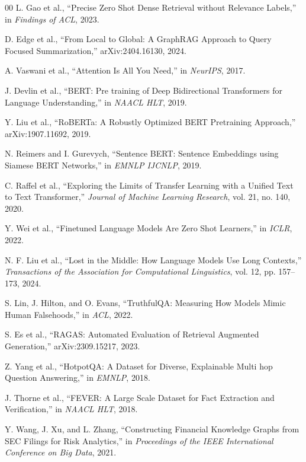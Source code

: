 \documentclass[conference]{IEEEtran}
\begin{document}
\begin{thebibliography}{00}
L. Gao et al., ``Precise Zero Shot Dense Retrieval without Relevance Labels,'' in \textit{Findings of ACL}, 2023.

D. Edge et al., ``From Local to Global: A GraphRAG Approach to Query Focused Summarization,'' arXiv:2404.16130, 2024.

A. Vaswani et al., ``Attention Is All You Need,'' in \textit{NeurIPS}, 2017.

J. Devlin et al., ``BERT: Pre training of Deep Bidirectional Transformers for Language Understanding,'' in \textit{NAACL HLT}, 2019.

Y. Liu et al., ``RoBERTa: A Robustly Optimized BERT Pretraining Approach,'' arXiv:1907.11692, 2019.

N. Reimers and I. Gurevych, ``Sentence BERT: Sentence Embeddings using Siamese BERT Networks,'' in \textit{EMNLP IJCNLP}, 2019.

C. Raffel et al., ``Exploring the Limits of Transfer Learning with a Unified Text to Text Transformer,'' \textit{Journal of Machine Learning Research}, vol. 21, no. 140, 2020.

Y. Wei et al., ``Finetuned Language Models Are Zero Shot Learners,'' in \textit{ICLR}, 2022.

N. F. Liu et al., ``Lost in the Middle: How Language Models Use Long Contexts,'' \textit{Transactions of the Association for Computational Linguistics}, vol. 12, pp. 157--173, 2024.

S. Lin, J. Hilton, and O. Evans, ``TruthfulQA: Measuring How Models Mimic Human Falsehoods,'' in \textit{ACL}, 2022.

S. Es et al., ``RAGAS: Automated Evaluation of Retrieval Augmented Generation,'' arXiv:2309.15217, 2023.

Z. Yang et al., ``HotpotQA: A Dataset for Diverse, Explainable Multi hop Question Answering,'' in \textit{EMNLP}, 2018.

J. Thorne et al., ``FEVER: A Large Scale Dataset for Fact Extraction and Verification,'' in \textit{NAACL HLT}, 2018.

Y. Wang, J. Xu, and L. Zhang, ``Constructing Financial Knowledge Graphs from SEC Filings for Risk Analytics,'' in \textit{Proceedings of the IEEE International Conference on Big Data}, 2021.


\end{thebibliography}
\end{document}
